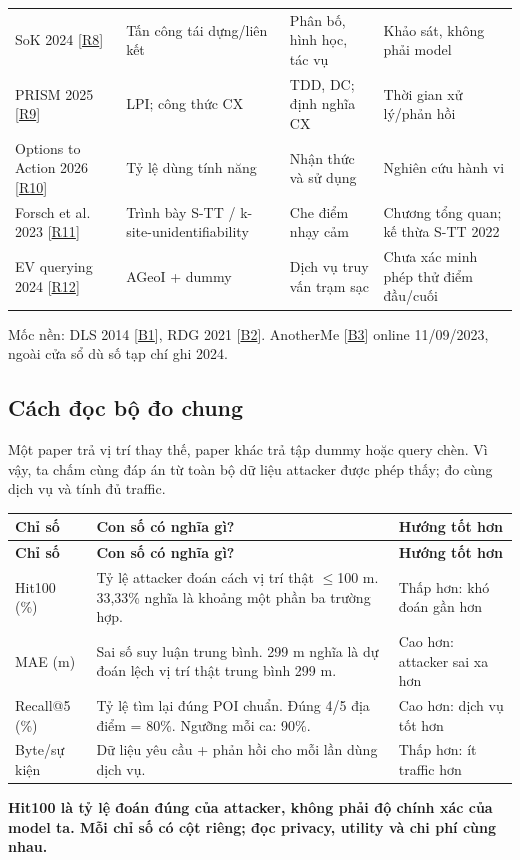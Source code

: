 \documentclass[10pt,a4paper]{article}
\newcommand{\key}[1]{\par\smallskip\noindent\colorbox{pale}{\parbox{\dimexpr\linewidth-2\fboxsep}{\textbf{#1}}}\par\smallskip}
\begin{document}
\begin{longtable}{@{}P{3.871cm}P{4.355cm}P{3.871cm}P{4.258cm}@{}}
\addlinespace[3pt]
SoK 2024 [\hyperlink{ref-R8}{R8}] & Tấn công tái dựng/liên kết & Phân bố, hình học, tác vụ & Khảo sát, không phải model\\
\addlinespace[3pt]
PRISM 2025 [\hyperlink{ref-R9}{R9}] & LPI; công thức CX & TDD, DC; định nghĩa CX & Thời gian xử lý/phản hồi\\
\addlinespace[3pt]
Options to Action 2026 [\hyperlink{ref-R10}{R10}] & Tỷ lệ dùng tính năng & Nhận thức và sử dụng & Nghiên cứu hành vi\\
\addlinespace[3pt]
Forsch et al. 2023 [\hyperlink{ref-R11}{R11}] & Trình bày S-TT / k-site-unidentifiability & Che điểm nhạy cảm & Chương tổng quan; kế thừa S-TT 2022\\
\addlinespace[3pt]
EV querying 2024 [\hyperlink{ref-R12}{R12}] & AGeoI + dummy & Dịch vụ truy vấn trạm sạc & Chưa xác minh phép thử điểm đầu/cuối\\
\end{longtable}
\endgroup
Mốc nền: DLS 2014 [\hyperlink{ref-B1}{B1}], RDG 2021 [\hyperlink{ref-B2}{B2}]. AnotherMe [\hyperlink{ref-B3}{B3}] online 11/09/2023, ngoài cửa sổ dù số tạp chí ghi 2024.

\subsection{Cách đọc bộ đo chung}\label{sub:1.2}
Một paper trả vị trí thay thế, paper khác trả tập dummy hoặc query chèn. Vì vậy, ta chấm cùng đáp án từ toàn bộ dữ liệu attacker được phép thấy; đo cùng dịch vụ và tính đủ traffic.

\begingroup\small
\begin{longtable}{@{}P{3.150cm}P{8.959cm}P{4.529cm}@{}}
\toprule
\textbf{Chỉ số} & \textbf{Con số có nghĩa gì?} & \textbf{Hướng tốt hơn}\\\midrule
\endfirsthead
\toprule
\textbf{Chỉ số} & \textbf{Con số có nghĩa gì?} & \textbf{Hướng tốt hơn}\\\midrule
\endhead
\bottomrule\endfoot
Hit100 (\%) & Tỷ lệ attacker đoán cách vị trí thật $\le$100 m. 33,33\% nghĩa là khoảng một phần ba trường hợp. & Thấp hơn: khó đoán gần hơn\\
\addlinespace[3pt]
MAE (m) & Sai số suy luận trung bình. 299 m nghĩa là dự đoán lệch vị trí thật trung bình 299 m. & Cao hơn: attacker sai xa hơn\\
\addlinespace[3pt]
Recall@5 (\%) & Tỷ lệ tìm lại đúng POI chuẩn. Đúng 4/5 địa điểm = 80\%. Ngưỡng mỗi ca: 90\%. & Cao hơn: dịch vụ tốt hơn\\
\addlinespace[3pt]
Byte/sự kiện & Dữ liệu yêu cầu + phản hồi cho mỗi lần dùng dịch vụ. & Thấp hơn: ít traffic hơn\\
\end{longtable}
\endgroup
\key{Hit100 là tỷ lệ đoán đúng của attacker, không phải độ chính xác của model ta. Mỗi chỉ số có cột riêng; đọc privacy, utility và chi phí cùng nhau.}
\end{document}
